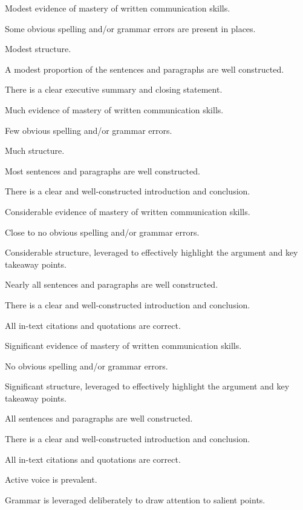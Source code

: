 \documentclass{../../fal_assignment}
\begin{document}
\begin{markingrubric}
        \grade 		Modest evidence of mastery of written communication skills.
        \par 		Some obvious spelling and/or grammar errors are present in places.
        \par 		Modest structure.   
        \par 		A modest proportion of the sentences and paragraphs are well constructed.
        \par 		There is a clear executive summary and closing statement.
        
        \grade 		Much evidence of mastery of written communication skills.

        \par 		Few obvious spelling and/or grammar errors.
        \par 		Much structure.   
        \par 		Most sentences and paragraphs are well constructed.
        \par 		There is a clear and well-constructed introduction and conclusion.
        
        \grade 		Considerable evidence of mastery of written communication skills.
        
        \par 		Close to no obvious spelling and/or grammar errors.
        \par 		Considerable structure, leveraged to effectively highlight the argument and key takeaway points.  
        \par 		Nearly all sentences and paragraphs are well constructed.
        \par 		There is a clear and well-constructed introduction and conclusion.
        \par 		All in-text citations and quotations are correct. 
        
        \grade 		Significant evidence of mastery of written communication skills.
        
        \par 		No obvious spelling and/or grammar errors. 
        \par 		Significant structure, leveraged to effectively highlight the argument and key takeaway points.  
        \par 		All sentences and paragraphs are well constructed.
        \par 		There is a clear and well-constructed introduction and conclusion.
        \par 		All in-text citations and quotations are correct.
       \par 		Active voice is prevalent.
        \par 		Grammar is leveraged deliberately to draw attention to salient points.    
        
\end{markingrubric}
\end{document}
